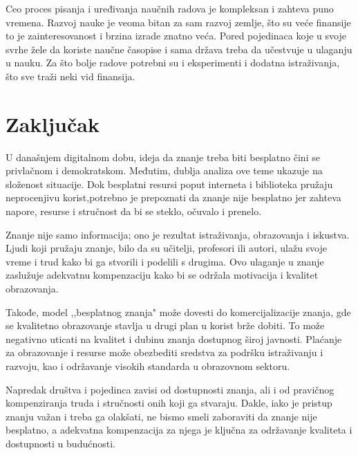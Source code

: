 \documentclass[12pt,a4paper]{article}
\begin{document}
   Ceo proces pisanja i uređivanja naučnih radova je kompleksan i zahteva puno vremena. Razvoj nauke je veoma bitan za sam razvoj zemlje, što su veće finansije to je zainteresovanost i brzina izrade znatno veća. Pored pojedinaca koje u svoje svrhe žele da koriste naučne časopise i sama država treba da učestvuje u ulaganju u nauku. Za što bolje radove potrebni su i eksperimenti i dodatna istraživanja, što sve traži neki vid finansija. 


   
\section{\large\textbf{Zaključak}}
\indent

    U današnjem digitalnom dobu, ideja da znanje treba biti besplatno čini se privlačnom i demokratskom. Međutim, dublja analiza ove teme ukazuje na složenost situacije. Dok besplatni resursi poput interneta i biblioteka pružaju neprocenjivu korist,potrebno je prepoznati da znanje nije besplatno jer zahteva napore, resurse i stručnost da bi se steklo, očuvalo i prenelo.

    Znanje nije samo informacija; ono je rezultat istraživanja, obrazovanja i iskustva. Ljudi koji pružaju znanje, bilo da su učitelji, profesori ili autori, ulažu svoje vreme i trud kako bi ga stvorili i podelili s drugima. Ovo ulaganje u znanje zaslužuje adekvatnu kompenzaciju kako bi se održala motivacija i kvalitet obrazovanja.

    Takođe, model ,,besplatnog znanja" može dovesti do komercijalizacije znanja, gde se kvalitetno obrazovanje stavlja u drugi plan u korist brže dobiti. To može negativno uticati na kvalitet i dubinu znanja dostupnog široj javnosti. Plaćanje za obrazovanje i resurse može obezbediti sredstva za podršku istraživanju i razvoju, kao i održavanje visokih standarda u obrazovnom sektoru.

    Napredak društva i pojedinca zavisi od dostupnosti znanja, ali i od pravičnog kompenziranja truda i stručnosti onih koji ga stvaraju. Dakle, iako je pristup znanju važan i treba ga olakšati, ne bismo smeli zaboraviti da znanje nije besplatno, a adekvatna kompenzacija za njega je ključna za održavanje kvaliteta i dostupnosti u budućnosti.
\newpage
\end{document}
